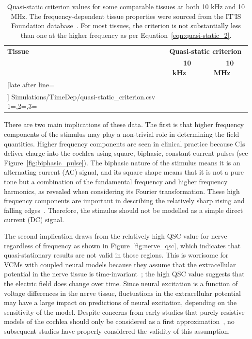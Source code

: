 \begin{table}
	\centering
	\sffamily
	\small
	\caption[Quasi-static criterion values at 10 kHz and 10 MHz]{Quasi-static
	criterion values for some comparable tissues at both 10 kHz and 10 MHz. The
	frequency-dependent tissue properties were sourced from the IT'IS Foundation
	database~\cite{hasgall2015}. For most tissues, the criterion is not
	substantially less than one at the higher frequency as per
	Equation~\ref{eqn:quasi-static_2}.}
	\label{table:quasi-static_criterion}
	
	\begin{tabularx}{0.5\textwidth}{X c c}
		\toprule
		\textbf{Tissue}	& \multicolumn{2}{c}{\textbf{Quasi-static criterion}} \\
						& \textbf{~~10 kHz~~}	& \textbf{~~10 MHz~~} \\
		\midrule
		\csvreader[late after line=\\]%
			{Simulations/TimeDep/quasi-static_criterion.csv}%
			{1=\tissue,2=\fund,3=\harm}%
 			{\tissue & \fund & \harm}%
		\bottomrule
	\end{tabularx}
	
\end{table}

There are two main implications of these data. The first is that higher
frequency components of the stimulus may play a non-trivial role in determining
the field quantities. Higher frequency components are seen in clinical practice
because CIs deliver charge into the cochlea using square, biphasic,
constant-current pulses (see Figure~\ref{fig:biphasic_pulse}). The biphasic
nature of the stimulus means it is an alternating current (AC) signal, and its
square shape means that it is not a pure tone but a combination of the
fundamental frequency and higher frequency harmonics, as revealed when
considering its Fourier transformation. These high frequency components are
important in describing the relatively sharp rising and falling
edges~\cite{kreyszig1988,tognola2007}. Therefore, the stimulus should not be
modelled as a simple direct current (DC) signal.

The second implication draws from the relatively high QSC value for nerve
regardless of frequency as shown in Figure~\ref{fig:nerve_qsc}, which indicates
that quasi-stationary results are not valid in those regions. This is worrisome
for VCMs with coupled neural models because they assume that the extracellular
potential in the nerve tissue is time-invariant~\cite{mcneal1976}; the high QSC
value suggests that the electric field does change over time. Since neural
excitation is a function of voltage differences in the nerve tissue,
fluctuations in the extracellular potential may have a large impact on
predictions of neural excitation, depending on the sensitivity of the model.
Despite concerns from early studies that purely resistive models of the cochlea
should only be considered as a first
approximation~\cite{finley1990,frijns1995,hanekom2001}, no subsequent studies
have properly considered the validity of this assumption.

